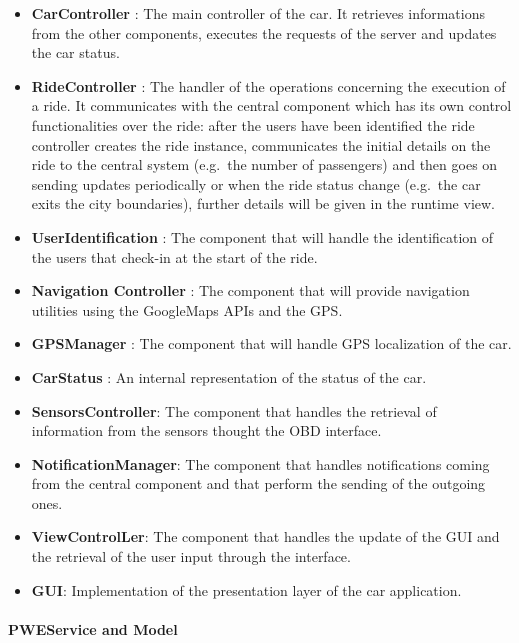 \documentclass[]{article}
\providecommand{\tightlist}{%
  \setlength{\itemsep}{0pt}\setlength{\parskip}{0pt}}
\let\oldparagraph\paragraph
\renewcommand{\paragraph}[1]{\oldparagraph{#1}\mbox{}}
\begin{document}
\begin{itemize}
\tightlist
\item
  \textbf{CarController} : The main controller of the car. It retrieves
  informations from the other components, executes the requests of the
  server and updates the car status.
\item
  \textbf{RideController} : The handler of the operations concerning the
  execution of a ride. It communicates with the central component which
  has its own control functionalities over the ride: after the users
  have been identified the ride controller creates the ride instance,
  communicates the initial details on the ride to the central system
  (e.g.~the number of passengers) and then goes on sending updates
  periodically or when the ride status change (e.g.~the car exits the
  city boundaries), further details will be given in the runtime view.
\item
  \textbf{UserIdentification} : The component that will handle the
  identification of the users that check-in at the start of the ride.
\item
  \textbf{Navigation Controller} : The component that will provide
  navigation utilities using the GoogleMaps APIs and the GPS.
\item
  \textbf{GPSManager} : The component that will handle GPS localization
  of the car.
\item
  \textbf{CarStatus} : An internal representation of the status of the
  car.
\item
  \textbf{SensorsController}: The component that handles the retrieval
  of information from the sensors thought the OBD interface.
\item
  \textbf{NotificationManager}: The component that handles notifications
  coming from the central component and that perform the sending of the
  outgoing ones.
\item
  \textbf{ViewControlLer}: The component that handles the update of the
  GUI and the retrieval of the user input through the interface.
\item
  \textbf{GUI}: Implementation of the presentation layer of the car
  application. \newpage
\end{itemize}

\paragraph{PWEService and Model}\label{pweservice-and-model}
\end{document}
